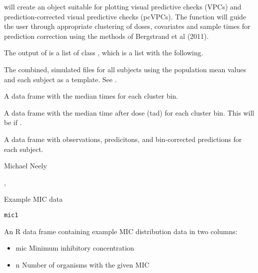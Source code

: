 \documentclass[a4paper]{book}
\begin{document}
%
\begin{Details}\relax
{} will create an object suitable for plotting visual predictive checks (VPCs) and prediction-corrected visual
predictive checks (pcVPCs). The function will guide the user
through appropriate clustering of doses, covariates and sample times for prediction correction using the methods of Bergstrand et al (2011).
\end{Details}
%
\begin{Value}
The output of  is a list of class , which is a list with the following.  
\begin{ldescription}
\item[\code{simdata}] The combined, simulated files for all subjects using the population mean values and each subject
as a template. See .
\item[\code{timeBinMedian}] A data frame with the median times for each cluster bin.
\item[\code{tadBinMedian}] A data frame with the median time after dose (tad) for each cluster bin.  This will be  if 
.
\item[\code{opDF}] A data frame with observations, predicitons, and bin-corrected predictions for each subject.
\end{ldescription}
\end{Value}
%
\begin{Author}\relax
Michael Neely
\end{Author}
%
\begin{SeeAlso}\relax
{}, 
\end{SeeAlso}
%
\begin{Description}\relax
Example MIC data
\end{Description}
%
\begin{Usage}
\begin{verbatim}
mic1
\end{verbatim}
\end{Usage}
%
\begin{Format}
An R data frame containing example MIC distribution data in two columns:
\begin{itemize}

\item{} mic Minimum inhibitory concentration
\item{} n Number of organisms with the given MIC

\end{itemize}
\end{Format}
\end{document}
